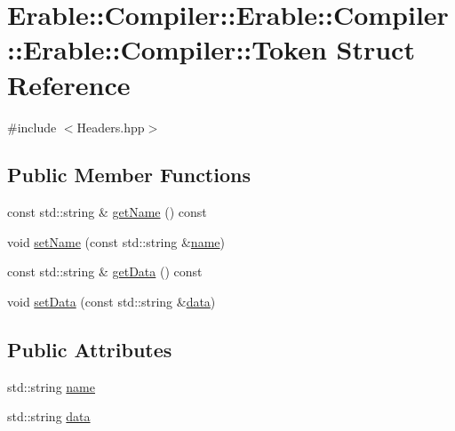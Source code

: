 \hypertarget{struct_erable_1_1_compiler_1_1_erable_1_1_compiler_1_1_erable_1_1_compiler_1_1_token}{}\section{Erable\+::Compiler\+::Erable\+::Compiler\+::Erable\+::Compiler\+::Token Struct Reference}
\label{struct_erable_1_1_compiler_1_1_erable_1_1_compiler_1_1_erable_1_1_compiler_1_1_token}


{\ttfamily \#include $<$Headers.\+hpp$>$}

\subsection*{Public Member Functions}
\begin{DoxyCompactItemize}
\item 
const std\+::string \& \mbox{\hyperlink{struct_erable_1_1_compiler_1_1_erable_1_1_compiler_1_1_erable_1_1_compiler_1_1_token_aee106c96b359f216bfbe1f300aa39294}{get\+Name}} () const
\item 
void \mbox{\hyperlink{struct_erable_1_1_compiler_1_1_erable_1_1_compiler_1_1_erable_1_1_compiler_1_1_token_a0bdf856a7917e60e6b399c6e30a8c58e}{set\+Name}} (const std\+::string \&\mbox{\hyperlink{struct_erable_1_1_compiler_1_1_erable_1_1_compiler_1_1_erable_1_1_compiler_1_1_token_a0e08ccf5ccfcba6403d678017aa013a5}{name}})
\item 
const std\+::string \& \mbox{\hyperlink{struct_erable_1_1_compiler_1_1_erable_1_1_compiler_1_1_erable_1_1_compiler_1_1_token_a644b73be77310769013028fcaaa5a22c}{get\+Data}} () const
\item 
void \mbox{\hyperlink{struct_erable_1_1_compiler_1_1_erable_1_1_compiler_1_1_erable_1_1_compiler_1_1_token_a0f91574f56d029d40f0ece004b7c9f9c}{set\+Data}} (const std\+::string \&\mbox{\hyperlink{struct_erable_1_1_compiler_1_1_erable_1_1_compiler_1_1_erable_1_1_compiler_1_1_token_a2242aa04fed42f2f36f6a6b11daf5fb3}{data}})
\end{DoxyCompactItemize}
\subsection*{Public Attributes}
\begin{DoxyCompactItemize}
\item 
std\+::string \mbox{\hyperlink{struct_erable_1_1_compiler_1_1_erable_1_1_compiler_1_1_erable_1_1_compiler_1_1_token_a0e08ccf5ccfcba6403d678017aa013a5}{name}}
\item 
std\+::string \mbox{\hyperlink{struct_erable_1_1_compiler_1_1_erable_1_1_compiler_1_1_erable_1_1_compiler_1_1_token_a2242aa04fed42f2f36f6a6b11daf5fb3}{data}}
\end{DoxyCompactItemize}

